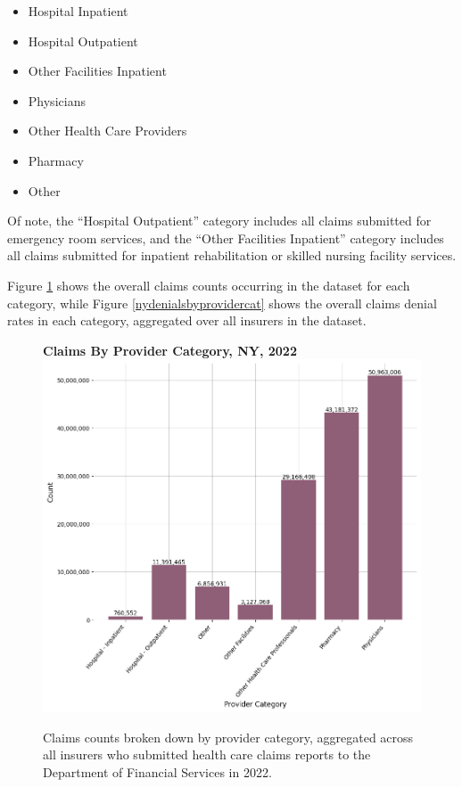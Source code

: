 \documentclass[12pt, a4paper,twoside]{report}
\theoremstyle{plain} %
\theoremstyle{definition} %
\theoremstyle{remark} %
\numberwithin{equation}{chapter}
\begin{document}
		\begin{itemize}
			\item Hospital Inpatient
			\item Hospital Outpatient
			\item Other Facilities Inpatient
			\item Physicians
			\item Other Health Care Providers
			\item Pharmacy
			\item Other
		\end{itemize}
	
		Of note, the ``Hospital Outpatient'' category includes all claims submitted for emergency room services, and the ``Other Facilities Inpatient'' category includes all claims submitted for inpatient rehabilitation or skilled nursing facility services.
		
		Figure \ref{nyclaimsbyprovidercat} shows the overall claims counts occurring in the dataset for each category, while Figure \ref{nydenialsbyprovidercat} shows the overall claims denial rates in each category, aggregated over all insurers in the dataset.
		
		
		\begin{figure}[h!]
			\centering
			\textbf{Claims By Provider Category, NY, 2022}
			\includegraphics[width=\columnwidth]{images/ny_claim_reports/claims_by_provider_cat.png}
			\caption{ Claims counts broken down by provider category, aggregated across all insurers who submitted health care claims reports to the Department of Financial Services in 2022.}
			\label{nyclaimsbyprovidercat}
		\end{figure}
	
\end{document}
